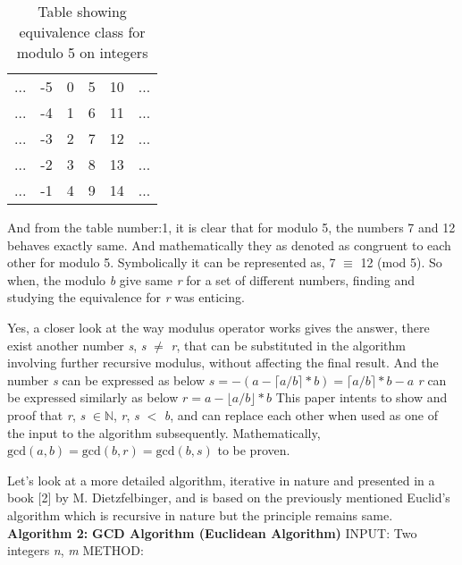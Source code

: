 \documentclass[conference,compsoc]{IEEEtran}
\newcommand{\N}{{\mathbb N}}
\newcommand{\var}[1]{\textit{#1}}
\renewcommand{\gcd}{\text{gcd}}
\newcommand{\ceil}[1]{\lceil#1\rceil}
\newcommand{\floor}[1]{\lfloor#1\rfloor}
\begin{document}
\begin{table}[!htbp]
\renewcommand{\arraystretch}{1.3}
\caption{Table showing equivalence class for modulo 5 on integers}
\label{table:1}
\centering
	\begin{tabular}{c c c c c c}
		... & -5 & 0 & 5 & 10 & ... \\
		... & -4 & 1 & 6 & 11 & ... \\
		... & -3 & 2 & 7 & 12 & ... \\
		... & -2 & 3 & 8 & 13 & ... \\
		... & -1 & 4 & 9 & 14 & ...
	\end{tabular}
\end{table}

And from the table number:1, it is clear that for modulo 5, the numbers 7 and 12 behaves exactly same. And mathematically they as denoted as congruent to each other for modulo 5.
Symbolically it can be represented as, 7 $\equiv$ 12 (mod 5).
So when, the modulo \var{b} give same \var{r} for a set of different numbers, finding and studying the equivalence for \var{r} was enticing.

Yes, a closer look at the way modulus operator works gives the answer, there exist another  number \var{s}, \var{s} $\neq$ \var{r}, that can be substituted in the algorithm involving further recursive modulus, without affecting the final result. And the number \textit{s} can be expressed as below
\newline $s = -(a-\ceil{a/b}*b) = \ceil{a/b}*b - a$
\newline \textit{r} can be expressed similarly as below
\newline $r = a - \floor{a/b}*b$
\newline This paper intents to show and proof that \textit{r}, \textit{s} $\in \N$, \textit{r}, \textit{s} $<$ \textit{b}, and can replace each other when used as one of the input to the algorithm subsequently. Mathematically, $\gcd(a,b) =\gcd(b,r) = \gcd(b,s)$ to be proven.


Let's look at a more detailed algorithm, iterative in nature and presented in a book [2] by M. Dietzfelbinger, and is based on the previously mentioned Euclid's algorithm which is recursive in nature but the principle remains same.
\newline
\newline \textbf{Algorithm 2:}
\newline \textbf{GCD Algorithm (Euclidean Algorithm)}
\newline INPUT: Two integers \var{n}, \var{m}
\newline METHOD:
\end{document}

